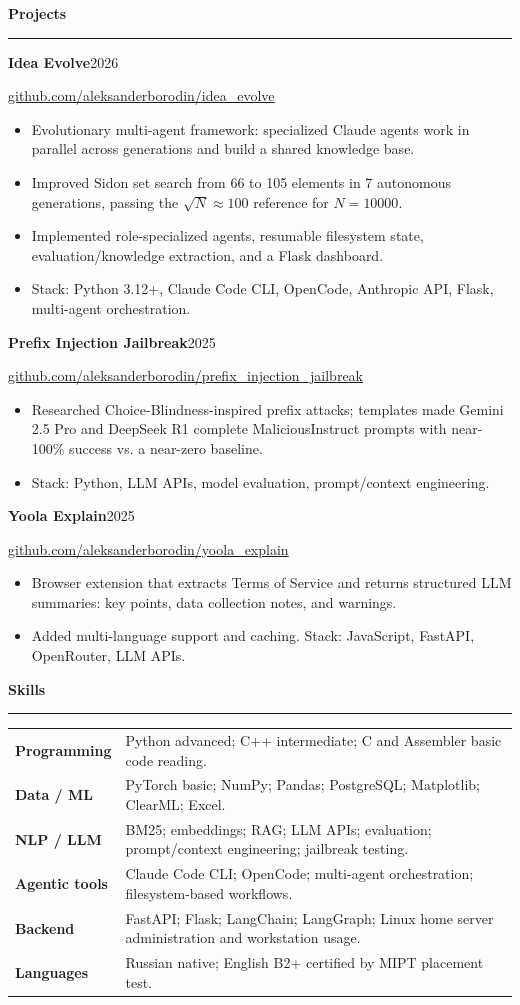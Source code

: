 \documentclass[10pt,a4paper]{article}
\newcommand{\sectiontitle}[1]{%
  \vspace{0.42em}%
  {\normalsize\bfseries\color{accent} #1}\par
  \vspace{0.10em}\hrule\vspace{0.24em}%
}
\newcommand{\entry}[4]{%
  \textbf{#1}\hfill {\color{textgray}#2}\par
  {\color{textgray}#3}\par
  #4\vspace{0.25em}%
}
\begin{document}
\sectiontitle{Projects}
\entry{Idea Evolve}{2026}{\href{https://github.com/aleksanderborodin/idea_evolve}{github.com/aleksanderborodin/idea\_evolve}}{%
\begin{itemize}
  \item Evolutionary multi-agent framework: specialized Claude agents work in parallel across generations and build a shared knowledge base.
  \item Improved Sidon set search from 66 to 105 elements in 7 autonomous generations, passing the $\sqrt{N}\approx100$ reference for $N=10000$.
  \item Implemented role-specialized agents, resumable filesystem state, evaluation/knowledge extraction, and a Flask dashboard.
  \item Stack: Python 3.12+, Claude Code CLI, OpenCode, Anthropic API, Flask, multi-agent orchestration.
\end{itemize}
}

\entry{Prefix Injection Jailbreak}{2025}{\href{https://github.com/aleksanderborodin/prefix_injection_jailbreak}{github.com/aleksanderborodin/prefix\_injection\_jailbreak}}{%
\begin{itemize}
  \item Researched Choice-Blindness-inspired prefix attacks; templates made Gemini 2.5 Pro and DeepSeek R1 complete MaliciousInstruct prompts with near-100\% success vs. a near-zero baseline.
  \item Stack: Python, LLM APIs, model evaluation, prompt/context engineering.
\end{itemize}
}

\entry{Yoola Explain}{2025}{\href{https://github.com/aleksanderborodin/yoola_explain}{github.com/aleksanderborodin/yoola\_explain}}{%
\begin{itemize}
  \item Browser extension that extracts Terms of Service and returns structured LLM summaries: key points, data collection notes, and warnings.
  \item Added multi-language support and caching. Stack: JavaScript, FastAPI, OpenRouter, LLM APIs.
\end{itemize}
}

\sectiontitle{Skills}
\begin{tabularx}{\textwidth}{@{}>{\bfseries}p{2.65cm}X@{}}
Programming & Python advanced; C++ intermediate; C and Assembler basic code reading. \\
Data / ML & PyTorch basic; NumPy; Pandas; PostgreSQL; Matplotlib; ClearML; Excel. \\
NLP / LLM & BM25; embeddings; RAG; LLM APIs; evaluation; prompt/context engineering; jailbreak testing. \\
Agentic tools & Claude Code CLI; OpenCode; multi-agent orchestration; filesystem-based workflows. \\
Backend & FastAPI; Flask; LangChain; LangGraph; Linux home server administration and workstation usage. \\
Languages & Russian native; English B2+ certified by MIPT placement test. \\
\end{tabularx}
\end{document}
